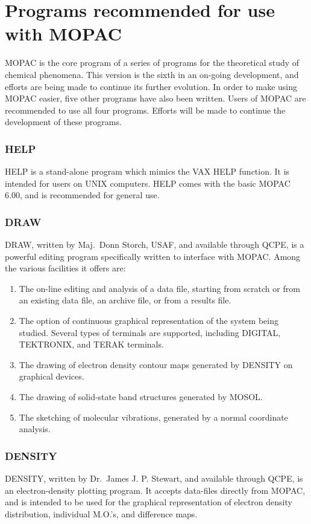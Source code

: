 \documentclass[11pt]{book}
\newcommand{\mi}[1]{#1\index{#1}}
\begin{document}
\section{Programs recommended for use with MOPAC}
   MOPAC is the core program of a series of  programs  for  the  theoretical
   study  of  chemical  phenomena.  This version is the sixth in an on-going
   development,  and  efforts  are  being  made  to  continue  its   further
   evolution.  In order to make using MOPAC easier, five other programs have
   also been written.  Users of  MOPAC  are  recommended  to  use  all  four
   programs.   Efforts  will  be  made  to continue the development of these
   programs.
  
\subsubsection{HELP}
  HELP is a stand-alone program which mimics the  \mi{VAX}  HELP  function.
  It is intended for users on UNIX computers. \mi{HELP} comes with the basic
  MOPAC 6.00, and is recommended for general use.

\subsubsection{DRAW}
   DRAW, written by Maj.\ Donn Storch, USAF, 
   and available through QCPE,
   is  a  powerful  editing  program  specifically written to interface with
   MOPAC.  Among the various facilities it offers are:
\begin{enumerate}
\item The on-line editing and analysis of a data file,  starting  from
scratch  or from an existing data file, an archive file, or from
a results file.
\item The option of continuous graphical representation of the  system
being  studied.   Several  types  of  terminals  are  supported,
including DIGITAL, TEKTRONIX, and TERAK terminals.
\item The drawing  of  electron  density  contour  maps  generated  by
DENSITY on graphical devices.
\item The drawing of solid-state band structures generated by MOSOL.
\item The sketching of molecular vibrations,  generated  by  a  normal
coordinate analysis.
\end{enumerate}

\subsubsection{DENSITY}
   \mi{DENSITY}, written by Dr.\ James J. P. Stewart, and available  through
   QCPE,  is  an  electron-density  plotting program.  It accepts data-files
   directly from MOPAC, and  is  intended  to  be  used  for  the  graphical
   representation  of  electron density distribution, individual M.O.'s, and
   difference maps.
        
\end{document}
